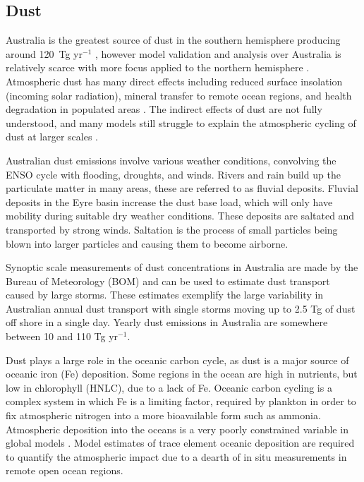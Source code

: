 \subsection{Dust}

Australia is the greatest source of dust in the southern hemisphere producing around 120~Tg yr$^{-1}$ \cite{Li_2008}, however model validation and analysis over Australia is relatively scarce with more focus applied to the northern hemisphere \cite{Duncan_Fairlie_2007,Ridley_2013}.
Atmospheric dust has many direct effects including reduced surface insolation (incoming solar radiation), mineral transfer to remote ocean regions, and health degradation in populated areas \cite{Shao_2007}.
The indirect effects of dust are not fully understood, and many models still struggle to explain the atmospheric cycling of dust at larger scales \cite{Rotstayn_2011}.

Australian dust emissions involve various weather conditions, convolving the ENSO cycle with flooding, droughts, and winds.
Rivers and rain build up the particulate matter in many areas, these are referred to as fluvial deposits.
Fluvial deposits in the Eyre basin increase the dust base load, which will only have mobility during suitable dry weather conditions.
These deposits are saltated and transported by strong winds\cite{Zender_2003}.
Saltation is the process of small particles being blown into larger particles and causing them to become airborne.

Synoptic scale measurements of dust concentrations in Australia are made by the Bureau of Meteorology (BOM) and can be used to estimate dust transport caused by large storms. 
These estimates exemplify the large variability in Australian annual dust transport with single storms moving up to 2.5 Tg of dust off shore in a single day.
Yearly dust emissions in Australia are somewhere between 10 and 110 Tg yr$^{-1}$.

Dust plays a large role in the oceanic carbon cycle, as dust is a major source of oceanic iron (Fe) deposition.
Some regions in the ocean are high in nutrients, but low in chlorophyll (HNLC), due to a lack of Fe.
Oceanic carbon cycling is a complex system in which Fe is a limiting factor, required by plankton in order to fix atmospheric nitrogen into a more bioavailable form such as ammonia.
Atmospheric deposition into the oceans is a very poorly constrained variable in global models \cite{Grand_2015}.
Model estimates of trace element oceanic deposition are required to quantify the atmospheric impact due to a dearth of in situ measurements in remote open ocean regions.

